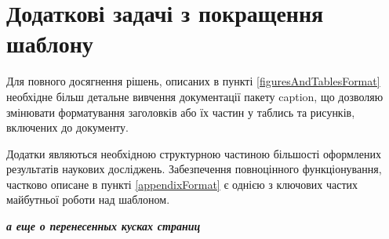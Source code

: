 \section{Додаткові задачі з покращення шаблону}

Для повного досягнення рішень, описаних в пункті \ref{figuresAndTablesFormat} необхідне більш детальне вивчення документації пакету caption, що дозволяю змінювати форматування заголовків або їх частин у таблись та рисунків, включених до документу.

Додатки являються необхідною структурною частиною більшості оформлених результатів наукових досліджень. Забезпечення повноцінного функціонування, частково описане в пункті \ref{appendixFormat} є однією з ключових частих майбутньої роботи над шаблоном.

\textbf{\textit{а еще о перенесенных кусках страниц}}
